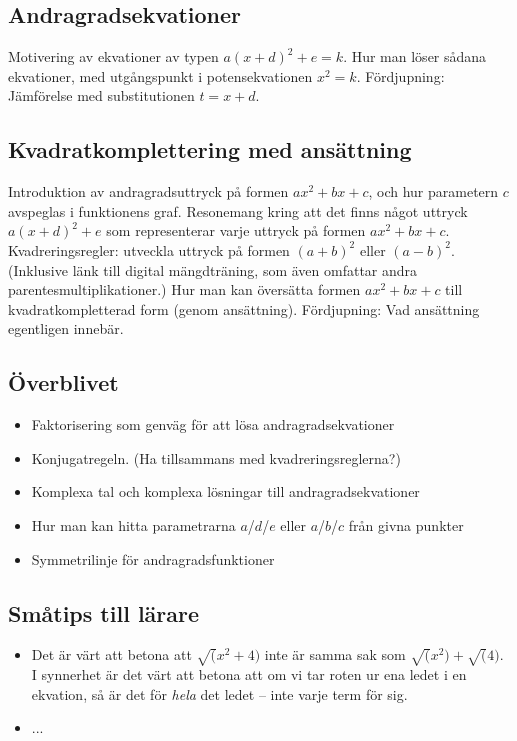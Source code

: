 \documentclass[12pt]{article}
\begin{document}
  \subsection{Andragradsekvationer}
  Motivering av ekvationer av typen $a(x+d)^2+e=k$.
  Hur man löser sådana ekvationer, med utgångspunkt i potensekvationen $x^2 = k$.
  Fördjupning: Jämförelse med substitutionen $t=x+d$.

  \subsection{Kvadratkomplettering med ansättning}
  Introduktion av andragradsuttryck på formen $ax^2+bx+c$, och hur parametern $c$ avspeglas i funktionens graf.
  Resonemang kring att det finns något uttryck $a(x+d)^2+e$ som representerar varje uttryck på formen $ax^2+bx+c$.
  Kvadreringsregler: utveckla uttryck på formen $(a+b)^2$ eller $(a-b)^2$.
  (Inklusive länk till digital mängdträning, som även omfattar andra parentesmultiplikationer.)
  Hur man kan översätta formen $ax^2+bx+c$ till kvadratkompletterad form (genom ansättning).
  Fördjupning: Vad ansättning egentligen innebär.
  
  \subsection{Överblivet}
  \begin{itemize}
    \item Faktorisering som genväg för att lösa andragradsekvationer
    \item Konjugatregeln. (Ha tillsammans med kvadreringsreglerna?)
    \item Komplexa tal och komplexa lösningar till andragradsekvationer
    \item Hur man kan hitta parametrarna $a$/$d$/$e$ eller $a$/$b$/$c$ från givna punkter
    \item Symmetrilinje för andragradsfunktioner
  \end{itemize}
  
  \subsection{Småtips till lärare}
  \begin{itemize}
    \item Det är värt att betona att $\sqrt(x^2+4)$ inte är samma sak som $\sqrt(x^2)+\sqrt(4)$.
    I synnerhet är det värt att betona att om vi tar roten ur ena ledet i en ekvation, så är det för \emph{hela} det ledet -- inte varje term för sig.
    \item ...
  \end{itemize}
\end{document}
